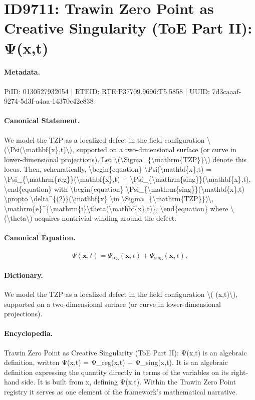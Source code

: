 \section*{ID9711: Trawin Zero Point as Creative Singularity (ToE Part II): Ψ(x,t)}
\paragraph{Metadata.}
PiID: 0130527932054 | RTEID: RTE:P37709.9696:T5.5858 | UUID: 7d3caaaf-9274-5d3f-a4aa-14370c42e838

\paragraph{Canonical Statement.}
We model the TZP as a localized defect in the field configuration \textbackslash{}(\textbackslash{}Psi(\textbackslash{}mathbf\{x\},t)\textbackslash{}), supported on a two-dimensional surface (or curve in lower-dimensional projections). Let \textbackslash{}(\textbackslash{}Sigma\_\{\textbackslash{}mathrm\{TZP\}\}\textbackslash{}) denote this locus. Then, schematically, \textbackslash{}begin\{equation\} \textbackslash{}Psi(\textbackslash{}mathbf\{x\},t) = \textbackslash{}Psi\_\{\textbackslash{}mathrm\{reg\}\}(\textbackslash{}mathbf\{x\},t) + \textbackslash{}Psi\_\{\textbackslash{}mathrm\{sing\}\}(\textbackslash{}mathbf\{x\},t), \textbackslash{}end\{equation\} with \textbackslash{}begin\{equation\} \textbackslash{}Psi\_\{\textbackslash{}mathrm\{sing\}\}(\textbackslash{}mathbf\{x\},t) \textbackslash{}propto \textbackslash{}delta\textasciicircum{}\{(2)\}(\textbackslash{}mathbf\{x\} \textbackslash{}in \textbackslash{}Sigma\_\{\textbackslash{}mathrm\{TZP\}\})\textbackslash{}, \textbackslash{}mathrm\{e\}\textasciicircum{}\{\textbackslash{}mathrm\{i\}\textbackslash{}theta(\textbackslash{}mathbf\{x\},t)\}, \textbackslash{}end\{equation\} where \textbackslash{}(\textbackslash{}theta\textbackslash{}) acquires nontrivial winding around the defect.

\paragraph{Canonical Equation.}
\[
\Psi(\mathbf{x},t) = \Psi_{\mathrm{reg}}(\mathbf{x},t) + \Psi_{\mathrm{sing}}(\mathbf{x},t),
\]

\paragraph{Dictionary.}
We model the TZP as a localized defect in the field configuration \textbackslash{}( (x,t)\textbackslash{}), supported on a two-dimensional surface (or curve in lower-dimensional projections).

\paragraph{Encyclopedia.}
Trawin Zero Point as Creative Singularity (ToE Part II): Ψ(x,t) is an algebraic definition, written Ψ(x,t) = Ψ\_reg(x,t) + Ψ\_sing(x,t). It is an algebraic definition expressing the quantity directly in terms of the variables on its right-hand side. It is built from x, defining Ψ(x,t). Within the Trawin Zero Point registry it serves as one element of the framework's mathematical narrative.
